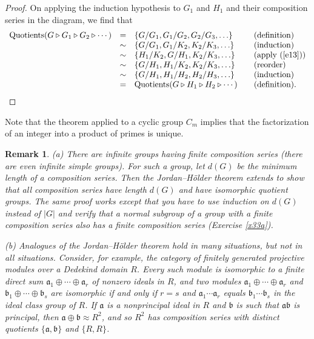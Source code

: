 \documentclass[a4paper,11pt,final]{memoir}%
\newtheorem{remark}[X]{Remark}
\theoremstyle{nonumberplain}
\newtheorem{proof}{Proof.}
\begin{document}
\begin{proof}
On applying the induction hypothesis to $G_{1}$ and $H_{1}$ and their
composition series in the diagram, we find that
\[%
\begin{array}
[c]{rclll}%
\text{Quotients}(G\triangleright G_{1}\triangleright G_{2}\triangleright
\cdots) & = & \{G/G_{1},G_{1}/G_{2},G_{2}/G_{3},\ldots\} &  &
\text{(definition)}\\
& \sim & \{G/G_{1},G_{1}/K_{2},K_{2}/K_{3},\ldots\} &  & \text{(induction)}\\
& \sim & \{H_{1}/K_{2},G/H_{1},K_{2}/K_{3},\ldots\} &  & \text{(apply
(\ref{e13}))}\\
& \sim & \{G/H_{1},H_{1}/K_{2},K_{2}/K_{3},\ldots\} &  & \text{(reorder)}\\
& \sim & \{G/H_{1},H_{1}/H_{2},H_{2}/H_{3},\ldots\} &  & \text{(induction)}\\
& = & \text{Quotients}(G\triangleright H_{1}\triangleright H_{2}%
\triangleright\cdots) &  & \text{(definition).}%
\end{array}
\]

\end{proof}

Note that the theorem applied to a cyclic group $C_{m}$ implies that the
factorization of an integer into a product of primes is unique.

\begin{remark}
\label{ns03}(a) There are infinite groups having finite composition series
(there are even infinite simple groups). For such a group, let $d(G)$ be the
minimum length of a composition series. Then the Jordan--H\"{o}lder theorem
extends to show that all composition series have length $d(G)$ and have
isomorphic quotient groups. The same proof works except that you have to use
induction on $d(G)$ instead of $|G|$ and verify that a normal subgroup of a
group with a finite composition series also has a finite composition series
(Exercise \ref{x33a}).

(b) Analogues of the Jordan--H\"{o}lder theorem hold in many situations, but
not in all situations. Consider, for example, the category of finitely
generated projective modules over a Dedekind domain $R$. Every such module is
isomorphic to a finite direct sum $\mathfrak{a}_{1}\oplus\cdots\oplus
\mathfrak{a}_{r}$ of nonzero ideals in $R$, and two modules $\mathfrak{a}%
_{1}\oplus\cdots\oplus\mathfrak{a}_{r}$ and $\mathfrak{b}_{1}\oplus
\cdots\oplus\mathfrak{b}_{s}$ are isomorphic if and only if $r=s$ and
$\mathfrak{a}_{1}\cdots\mathfrak{a}_{r}$ equals $\mathfrak{b}_{1}%
\cdots\mathfrak{b}_{s}$ in the ideal class group of $R$. If $\mathfrak{a}$ is
a nonprincipal ideal in $R$ and $\mathfrak{b}$ is such that $\mathfrak{a}%
\mathfrak{b}$ is principal, then $\mathfrak{a}\oplus\mathfrak{b}\approx R^{2}%
$, and so $R^{2}$ has composition series with distinct quotients
$\{\mathfrak{a},\mathfrak{b}\}$ and $\{R,R\}$.
\end{remark}
\end{document}
